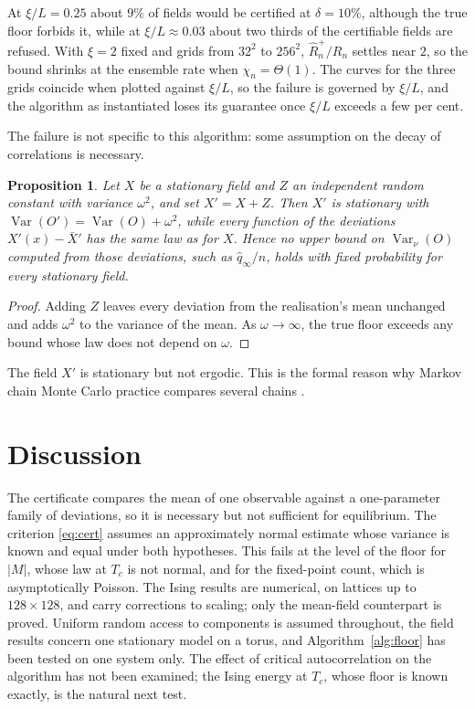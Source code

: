 \documentclass[ba,preprint]{imsart}
\theoremstyle{plain}
\newtheorem{proposition}[theorem]{Proposition}
\theoremstyle{definition}
\newcommand{\Var}{\operatorname{Var}}
\begin{document}
At $\xi/L=0.25$ about $9\%$ of fields would be certified at $\delta=10\%$, although the true floor forbids it, while at $\xi/L\approx0.03$ about two thirds of the certifiable fields are refused. With $\xi=2$ fixed and grids from $32^2$ to $256^2$, $\hat R_n^+/R_n$ settles near $2$, so the bound shrinks at the ensemble rate when $\chi_n=\Theta(1)$. The curves for the three grids coincide when plotted against $\xi/L$, so the failure is governed by $\xi/L$, and the algorithm as instantiated loses its guarantee once $\xi/L$ exceeds a few per cent.

The failure is not specific to this algorithm: some assumption on the decay of correlations is necessary.

\begin{proposition}\label{prop:nonergodic}
Let $X$ be a stationary field and $Z$ an independent random constant with variance $\omega^2$, and set $X'=X+Z$. Then $X'$ is stationary with $\Var(O')=\Var(O)+\omega^2$, while every function of the deviations $X'(x)-\bar X'$ has the same law as for $X$. Hence no upper bound on $\Var_\nu(O)$ computed from those deviations, such as $\hat q_\infty/n$, holds with fixed probability for every stationary field.
\end{proposition}

\begin{proof}
Adding $Z$ leaves every deviation from the realisation's mean unchanged and adds $\omega^2$ to the variance of the mean. As $\omega\to\infty$, the true floor exceeds any bound whose law does not depend on $\omega$.
\end{proof}

The field $X'$ is stationary but not ergodic. This is the formal reason why Markov chain Monte Carlo practice compares several chains \citep{GelmanRubin1992}.

\section{Discussion}\label{sec:discussion}

The certificate compares the mean of one observable against a one-parameter family of deviations, so it is necessary but not sufficient for equilibrium. The criterion \eqref{eq:cert} assumes an approximately normal estimate whose variance is known and equal under both hypotheses. This fails at the level of the floor for $|M|$, whose law at $T_c$ is not normal, and for the fixed-point count, which is asymptotically Poisson. The Ising results are numerical, on lattices up to $128\times128$, and carry corrections to scaling; only the mean-field counterpart is proved. Uniform random access to components is assumed throughout, the field results concern one stationary model on a torus, and Algorithm~\ref{alg:floor} has been tested on one system only. The effect of critical autocorrelation on the algorithm has not been examined; the Ising energy at $T_c$, whose floor is known exactly, is the natural next test.
\end{document}
